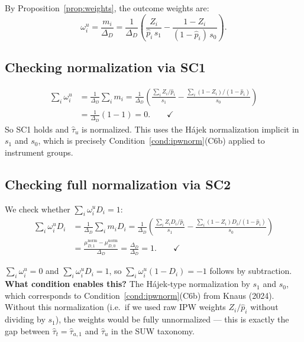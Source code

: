 \documentclass[12pt, a4paper]{article}
\theoremstyle{condstyle}
\theoremstyle{plain}
\newcommand{\that}[1]{\hat{\tau}_{#1}}
\newcommand{\phat}{\hat{p}}
\begin{document}
By Proposition~\ref{prop:weights}, the outcome weights are:
\begin{equation}
  \boxed{
    \omega_i^u = \frac{m_i}{\Delta_D}
    = \frac{1}{\Delta_D}\left(\frac{Z_i}{\phat_i\,s_1} - \frac{1-Z_i}{(1-\phat_i)\,s_0}\right).
  }
  \label{eq:w_u}
\end{equation}

\subsection{Checking normalization via SC1}

\begin{align*}
  \sum_i \omega_i^u
  &= \frac{1}{\Delta_D}\sum_i m_i
   = \frac{1}{\Delta_D}\left(\frac{\sum_i Z_i/\phat_i}{s_1}
     - \frac{\sum_i (1-Z_i)/(1-\phat_i)}{s_0}\right)\\
  &= \frac{1}{\Delta_D}(1 - 1) = 0. \qquad\checkmark
\end{align*}
So SC1 holds and $\that{u}$ is normalized.
This uses the Hájek normalization implicit in $s_1$ and $s_0$,
which is precisely Condition~\ref{cond:ipwnorm}(C6b) applied to instrument groups.

\subsection{Checking full normalization via SC2}

We check whether $\sum_i \omega_i^u D_i = 1$:
\begin{align*}
  \sum_i \omega_i^u D_i
  &= \frac{1}{\Delta_D}\sum_i m_i D_i
   = \frac{1}{\Delta_D}\left(\frac{\sum_i Z_i D_i/\phat_i}{s_1}
     - \frac{\sum_i (1-Z_i)D_i/(1-\phat_i)}{s_0}\right)\\
  &= \frac{\mu_{D,1}^{\mathrm{norm}} - \mu_{D,0}^{\mathrm{norm}}}{\Delta_D}
   = \frac{\Delta_D}{\Delta_D} = 1. \qquad\checkmark
\end{align*}

\begin{keyresult}[$\that{u}$ is fully normalized]
$\sum_i\omega_i^u = 0$ and $\sum_i\omega_i^u D_i = 1$,
so $\sum_i\omega_i^u(1-D_i) = -1$ follows by subtraction.\\[2pt]
\textbf{What condition enables this?}
The Hájek-type normalization by $s_1$ and $s_0$, which corresponds to
Condition~\ref{cond:ipwnorm}(C6b) from Knaus (2024).
Without this normalization (i.e.\ if we used raw IPW weights $Z_i/\phat_i$
without dividing by $s_1$), the weights would be fully unnormalized ---
this is exactly the gap between $\that{t} = \that{a,1}$ and $\that{u}$ in the SUW taxonomy.
\end{keyresult}
\end{document}
